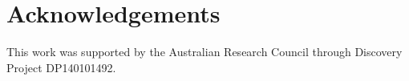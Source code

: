 \documentclass[12pt]{article}
\begin{document}






%
%
%
\section*{Acknowledgements}
%
This work was supported by the Australian Research Council through Discovery Project
DP140101492. 
%
%
%
%
%
\end{document}
